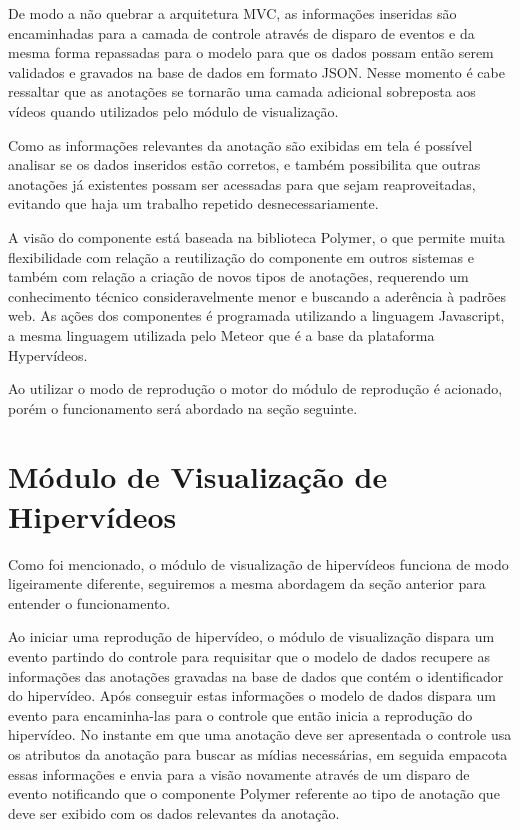 De modo a não quebrar a arquitetura MVC, as informações inseridas são encaminhadas para a camada de controle através de disparo de eventos e da mesma forma repassadas para o modelo para que os dados possam então serem validados e gravados na base de dados em formato JSON. Nesse momento é cabe ressaltar que as anotações se tornarão uma camada adicional sobreposta aos vídeos quando utilizados pelo módulo de visualização.

Como as informações relevantes da anotação são exibidas em tela é possível analisar se os dados inseridos estão corretos, e também possibilita que outras anotações já existentes possam ser acessadas para que sejam reaproveitadas, evitando que haja um trabalho repetido desnecessariamente.

A visão do componente está baseada na biblioteca Polymer, o que permite muita flexibilidade com relação a reutilização do componente em outros sistemas e também com relação a criação de novos tipos de anotações, requerendo um conhecimento técnico consideravelmente menor e buscando a aderência à padrões web. As ações dos componentes é programada utilizando a linguagem Javascript, a mesma linguagem utilizada pelo Meteor que é a base da plataforma Hypervídeos.

Ao utilizar o modo de reprodução o motor do módulo de reprodução é acionado, porém o funcionamento será abordado na seção seguinte.

\section{Módulo de Visualização de Hipervídeos}

Como foi mencionado, o módulo de visualização de hipervídeos funciona de modo ligeiramente diferente, seguiremos a mesma abordagem da seção anterior para entender o funcionamento.

Ao iniciar uma reprodução de hipervídeo, o módulo de visualização dispara um evento partindo do controle para requisitar que o modelo de dados recupere as informações das anotações gravadas na base de dados que contém o identificador do hipervídeo. Após conseguir estas informações o modelo de dados dispara um evento para encaminha-las para o controle que então inicia a reprodução do hipervídeo. No instante em que uma anotação deve ser apresentada o controle usa os atributos da anotação para buscar as mídias necessárias, em seguida empacota essas informações e envia para a visão novamente através de um disparo de evento notificando que o componente Polymer referente ao tipo de anotação que deve ser exibido com os dados relevantes da anotação.

